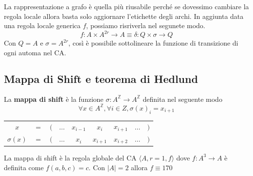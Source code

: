 La rappresentazione a grafo è quella più riusabile perché se dovessimo cambiare
la regola locale allora basta solo aggiornare l'etichette degli archi. In aggiunta
data una regola locale generica $f$, possiamo risriverla nel segunete modo.
\begin{equation}
    f: A\times A^{2r} \rightarrow A \equiv \delta: Q\times \sigma \rightarrow Q
\end{equation}
Con $Q= A$ e $\sigma = A^{2r} $, così è possibile sottolineare la funzione di transizione
di ogni automa nel CA.
\subsection{ Mappa di Shift e teorema di Hedlund}
\begin{definizione} 
    La \textbf{mappa di shift} è la funzione $\sigma:A^\mathbb{Z}\rightarrow A^\mathbb{Z}$
    definita nel seguente modo
    $$\forall x\in A^\mathbb{Z}, \forall i \in Z, \sigma(x)_i=x_{i+1}$$
    \begin{table}[!h]
        \centering
        \begin{tabular}{ccccccccc}
            $x$    & $=$ & $($ & $\dots$ & $x_{i-1}$ & $x_i$     & $x_{i+1}$ & $\dots$ & $)$ \\
            $\sigma(x)$ & $=$ & $($ & $\dots$ & $x_{i}$   & $x_{i+1}$ & $x_{i+2}$ & $\dots$ & $)$
        \end{tabular}
    \end{table}
\end{definizione}

\begin{nota}
    La mappa di shift è la regola globale del CA $\langle A,r=1,f\rangle$ dove 
    $f:A^3\rightarrow A$ è definita come $f(a,b,c) = c$. Con $|A|=2$ allora $f\equiv 170$

\end{nota}

